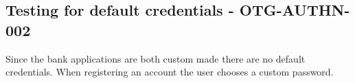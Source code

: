 \subsection{Testing for default credentials - OTG-AUTHN-002}
Since the bank applications are both custom made there are no default credentials. When registering an account the user chooses a custom password.
\clearpage